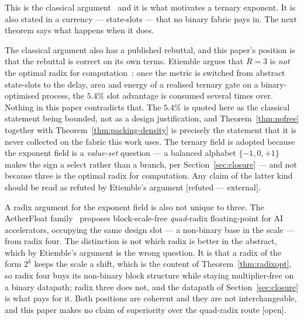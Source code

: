 \documentclass[11pt]{article}
\theoremstyle{definition}
\begin{document}
This is the classical argument~\cite{hayes2001,radixeconomy} and it is what
motivates a ternary exponent. It is also stated in a currency --- state-slots ---
that no binary fabric pays in. The next theorem says what happens when it does.

The classical argument also has a published rebuttal, and this paper's position is
that the rebuttal is correct on its own terms. Etiemble argues that $R=3$ is
\emph{not} the optimal radix for computation~\cite{etiemble2019}: once the metric
is switched from abstract state-slots to the delay, area and energy of a realised
ternary gate on a binary-optimised process, the $5.4\%$ slot advantage is consumed
several times over. Nothing in this paper contradicts that. The $5.4\%$ is quoted
here as the classical statement being bounded, not as a design justification, and
Theorem~\ref{thm:nofree} together with Theorem~\ref{thm:packing-density} is
precisely the statement that it is never collected on the fabric this work uses.
The ternary field is adopted because the exponent field is a \emph{value-set}
question --- a balanced alphabet $\{-1,0,+1\}$ makes the sign a select rather than
a branch, per Section~\ref{sec:closure} --- and not because three is the optimal
radix for computation. Any claim of the latter kind should be read as refuted by
Etiemble's argument [refuted --- external].

A radix argument for the exponent field is also not unique to three. The
AetherFloat family~\cite{aetherfloat} proposes block-scale-free \emph{quad}-radix
floating-point for AI accelerators, occupying the same design slot --- a
non-binary base in the scale --- from radix four. The distinction is not which
radix is better in the abstract, which by Etiemble's argument is the wrong
question. It is that a radix of the form $2^{k}$ keeps the scale a shift, which is
the content of Theorem~\ref{thm:radixopt}, so radix four buys its non-binary block
structure while staying multiplier-free on a binary datapath; radix three does
not, and the datapath of Section~\ref{sec:closure} is what pays for it. Both
positions are coherent and they are not interchangeable, and this paper makes no
claim of superiority over the quad-radix route [open].
\end{document}
